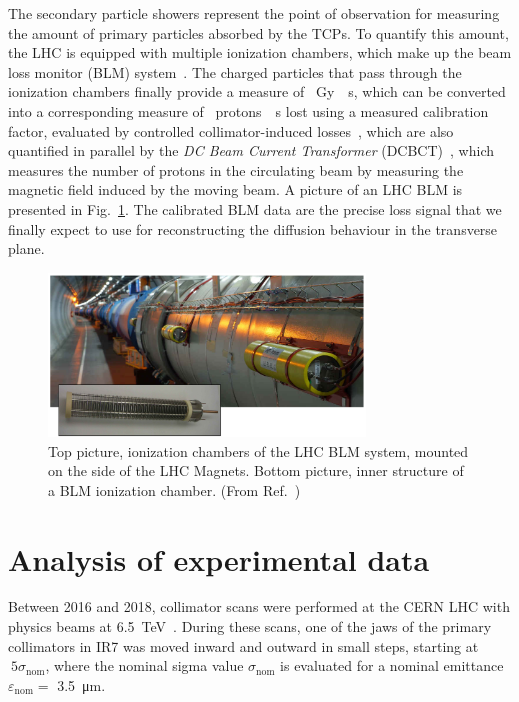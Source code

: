 The secondary particle showers represent the point of observation for measuring the amount of primary particles absorbed by the TCPs. To quantify this amount, the LHC is equipped with multiple ionization chambers, which make up the beam loss monitor (BLM) system~\cite{blmSystem1, blmSystem2}. The charged particles that pass through the ionization chambers finally provide a measure of \SI{}{Gy \per s}, which can be converted into a corresponding measure of \SI{}{protons \per s} lost using a measured calibration factor, evaluated by controlled collimator-induced losses~\cite{arek}, which are also quantified in parallel by the \textit{DC Beam Current Transformer} (DCBCT)~\cite{Denard:1213275}, which measures the number of protons in the circulating beam by measuring the magnetic field induced by the moving beam. A picture of an LHC BLM is presented in Fig.~\ref{fig:blm}. The calibrated BLM data are the precise loss signal that we finally expect to use for reconstructing the diffusion behaviour in the transverse plane.

\begin{figure}[hpt]
    \centering
    \includegraphics[width=0.75\textwidth]{5_Diffusion_measurement_LHC/figs/blm.png}
    \caption{Top picture, ionization chambers of the LHC BLM system, mounted on the side of the LHC Magnets. Bottom picture, inner structure of a BLM ionization chamber. (From Ref.~\cite{blmonline})}
    \label{fig:blm}
\end{figure}
%
\section{Analysis of experimental data}\label{sec:4:analysis}
%
Between 2016 and 2018, collimator scans were performed at the CERN LHC with physics beams at \SI{6.5}{TeV}~\cite{PhysRevAccelBeams.23.044802}. During these scans, one of the jaws of the primary collimators in IR7 was moved inward and outward in small steps, starting at $~5\sigma_\text{nom}$, where the nominal sigma value $\sigma_\text{nom}$ is evaluated for a nominal emittance $\varepsilon_\text{nom} =$ \SI{3.5}{\micro\meter}.

